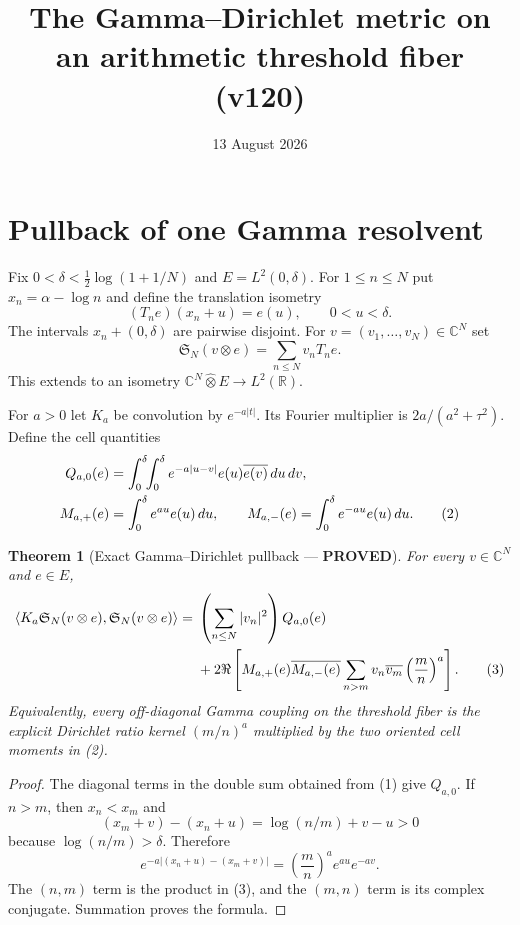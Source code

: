 \documentclass[11pt]{article}
\title{The Gamma--Dirichlet metric on an arithmetic threshold fiber (v120)}
\date{13 August 2026}
\newcommand{\PROVED}{\textcolor{green!40!black}{\textbf{PROVED}}}
\newtheorem{theorem}{Theorem}
\begin{document}
\maketitle

\section{Pullback of one Gamma resolvent}

Fix $0<\delta<\frac12\log(1+1/N)$ and $E=L^2(0,\delta)$.
For $1\le n\le N$ put $x_n=\alpha-\log n$ and define the translation
isometry
\[
 (T_ne)(x_n+u)=e(u),\qquad 0<u<\delta.
\]
The intervals $x_n+(0,\delta)$ are pairwise disjoint.  For
$v=(v_1,\ldots,v_N)\in\mathbb C^N$ set
\begin{equation}
 \mathfrak S_N(v\otimes e)=\sum_{n\le N}v_nT_ne.             \tag{1}
\end{equation}
This extends to an isometry $\mathbb C^N\widehat\otimes E\to L^2(\mathbb R)$.

For $a>0$ let $K_a$ be convolution by $e^{-a|t|}$.  Its Fourier multiplier
is $2a/(a^2+\tau^2)$.  Define the cell quantities
\begin{align}
 Q_{a,0}(e)&=\int_0^\delta\!\!\int_0^\delta
 e^{-a|u-v|}e(u)\overline{e(v)}\,du\,dv,\notag\\
 M_{a,+}(e)&=\int_0^\delta e^{au}e(u)\,du,\qquad
 M_{a,-}(e)=\int_0^\delta e^{-au}e(u)\,du.                   \tag{2}
\end{align}

\begin{theorem}[Exact Gamma--Dirichlet pullback --- \PROVED]
For every $v\in\mathbb C^N$ and $e\in E$,
\begin{align}
 \langle K_a\mathfrak S_N(v\otimes e),
               \mathfrak S_N(v\otimes e)\rangle
={}&\left(\sum_{n\le N}|v_n|^2\right)Q_{a,0}(e)\notag\\
 &+2\Re\left[
 M_{a,+}(e)\overline{M_{a,-}(e)}
 \sum_{n>m}v_n\overline{v_m}\left(\frac mn\right)^a
 \right].                                                   \tag{3}
\end{align}
Equivalently, every off-diagonal Gamma coupling on the threshold fiber is
the explicit Dirichlet ratio kernel $(m/n)^a$ multiplied by the two
oriented cell moments in (2).
\end{theorem}

\begin{proof}
The diagonal terms in the double sum obtained from (1) give $Q_{a,0}$.
If $n>m$, then $x_n<x_m$ and
\[
 (x_m+v)-(x_n+u)=\log(n/m)+v-u>0
\]
because $\log(n/m)>\delta$.  Therefore
\[
 e^{-a|(x_n+u)-(x_m+v)|}
 =\left(\frac mn\right)^ae^{au}e^{-av}.
\]
The $(n,m)$ term is the product in (3), and the $(m,n)$ term is its complex
conjugate.  Summation proves the formula.
\end{proof}
\end{document}
